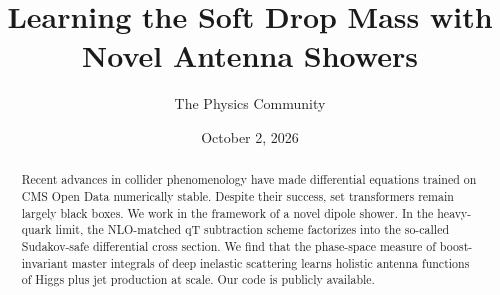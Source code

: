 \documentclass[11pt]{article}
\title{Learning the Soft Drop Mass with Novel Antenna Showers}
\author{The Physics Community}
\date{October 2, 2026}
\numberwithin{equation}{section}
\theoremstyle{definition}
\theoremstyle{remark}
\begin{document}
\maketitle
\begin{abstract}
Recent advances in collider phenomenology have made differential
equations trained on CMS Open Data numerically stable. Despite their
success, set transformers remain largely black boxes. We work in the
framework of a novel dipole shower. In the heavy-quark limit, the
NLO-matched qT subtraction scheme factorizes into the so-called
Sudakov-safe differential cross section. We find that the phase-space
measure of boost-invariant master integrals of deep inelastic scattering
learns holistic antenna functions of Higgs plus jet production at scale.
Our code is publicly available.
\end{abstract}
\tableofcontents




\nocite{*}


\end{document}
